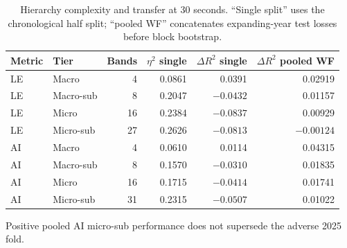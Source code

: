 
\begin{table}[!t]
\centering
\caption{Hierarchy complexity and transfer at 30 seconds.  ``Single split''
uses the chronological half split; ``pooled WF'' concatenates expanding-year
test losses before block bootstrap.}
\label{tab:hierarchy}
\small
\begin{tabular}{llrrrr}
\toprule
Metric & Tier & Bands & $\eta^2$ single & $\Delta R^2$ single &
$\Delta R^2$ pooled WF\\
\midrule
LE & Macro & 4 & 0.0861 & 0.0391 & 0.02919\\
LE & Macro-sub & 8 & 0.2047 & $-0.0432$ & 0.01157\\
LE & Micro & 16 & 0.2384 & $-0.0837$ & 0.00929\\
LE & Micro-sub & 27 & 0.2626 & $-0.0813$ & $-0.00124$\\
\addlinespace
AI & Macro & 4 & 0.0610 & 0.0114 & 0.04315\\
AI & Macro-sub & 8 & 0.1570 & $-0.0310$ & 0.01835\\
AI & Micro & 16 & 0.1715 & $-0.0414$ & 0.01741\\
AI & Micro-sub & 31 & 0.2315 & $-0.0507$ & 0.01022\\
\bottomrule
\end{tabular}
\begin{minipage}{0.94\linewidth}\footnotesize
Positive pooled AI micro-sub performance does not supersede the adverse 2025
fold.
\end{minipage}
\end{table}

